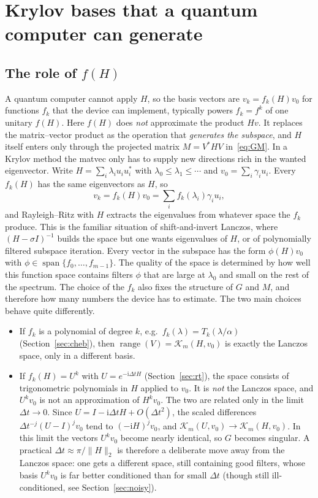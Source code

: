 \documentclass[11pt,a4paper]{article}
\newcommand{\K}{\mathcal{K}}
\begin{document}
\section{Krylov bases that a quantum computer can generate}

\subsection{\texorpdfstring{The role of $f(H)$}{The role of f(H)}}\label{sec:f}

A quantum computer cannot apply $H$, so the basis vectors are
$v_k = f_k(H)v_0$ for functions $f_k$ that the device can implement,
typically powers $f_k = f^k$ of one unitary $f(H)$. Here $f(H)$ does
\emph{not} approximate the product $Hv$. It replaces the
matrix--vector product as the operation that \emph{generates the
subspace}, and $H$ itself enters only through the projected matrix
$M=V^*HV$ in~\eqref{eq:GM}. In a Krylov method the matvec only has to
supply new directions rich in the wanted eigenvector. Write
$H=\sum_i\lambda_iu_iu_i^*$ with $\lambda_0\le\lambda_1\le\cdots$ and
$v_0=\sum_i\gamma_iu_i$. Every $f_k(H)$ has the same eigenvectors as $H$,
so
\[
  v_k = f_k(H) v_0 = \sum_i f_k(\lambda_i)\gamma_i u_i ,
\]
and Rayleigh--Ritz with $H$ extracts the eigenvalues from whatever space
the $f_k$ produce. This is the familiar situation of shift-and-invert
Lanczos, where $(H-\sigma I)^{-1}$ builds the space but one wants
eigenvalues of $H$, or of polynomially filtered subspace iteration.
Every vector in the subspace has the form $\phi(H)v_0$ with
$\phi\in\operatorname{span}\{f_0,\dots,f_{m-1}\}$. The quality of the
space is determined by how well this function space contains filters
$\phi$ that are large at $\lambda_0$ and small on the rest of the
spectrum. The choice of the $f_k$ also fixes the structure of $G$ and
$M$, and therefore how many numbers the device has to estimate. The two
main choices behave quite differently.
\begin{itemize}
\item If $f_k$ is a polynomial of degree $k$, e.g.\
  $f_k(\lambda)=T_k(\lambda/\alpha)$ (Section~\ref{sec:cheb}), then
  $\operatorname{range}(V)=\K_m(H,v_0)$ is exactly the Lanczos space,
  only in a different basis.
\item If $f_k(H)=U^k$ with $U=e^{-\mathrm{i}\Delta tH}$
  (Section~\ref{sec:rt}), the space consists of
  trigonometric polynomials in $H$ applied to $v_0$. It is \emph{not}
  the Lanczos space, and $U^kv_0$ is not an approximation of $H^kv_0$.
  The two are related only in the limit $\Delta t\to0$. Since
  $U = I-\mathrm{i}\Delta tH+O(\Delta t^2)$, the scaled differences
  $\Delta t^{-j}(U-I)^jv_0$ tend to $(-\mathrm{i}H)^jv_0$, and
  $\K_m(U,v_0)\to\K_m(H,v_0)$. In this limit the vectors $U^kv_0$
  become nearly identical, so $G$ becomes singular. A practical
  $\Delta t\approx\pi/\|H\|_2$ is therefore a deliberate move away from
  the Lanczos space: one gets a different space, still containing good
  filters, whose basis $U^kv_0$ is far better conditioned than for small
  $\Delta t$ (though still ill-conditioned, see Section~\ref{sec:noisy}).
\end{itemize}
\end{document}
